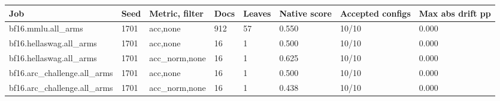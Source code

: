 \begin{tabular}{llllllll}
\hline
Job & Seed & Metric, filter & Docs & Leaves & Native score & Accepted configs & Max abs drift pp \\
\hline
bf16.mmlu.all\_arms & 1701 & acc,none & 912 & 57 & 0.550 & 10/10 & 0.000 \\
bf16.hellaswag.all\_arms & 1701 & acc,none & 16 & 1 & 0.500 & 10/10 & 0.000 \\
bf16.hellaswag.all\_arms & 1701 & acc\_norm,none & 16 & 1 & 0.625 & 10/10 & 0.000 \\
bf16.arc\_challenge.all\_arms & 1701 & acc,none & 16 & 1 & 0.500 & 10/10 & 0.000 \\
bf16.arc\_challenge.all\_arms & 1701 & acc\_norm,none & 16 & 1 & 0.438 & 10/10 & 0.000 \\
\hline
\end{tabular}
